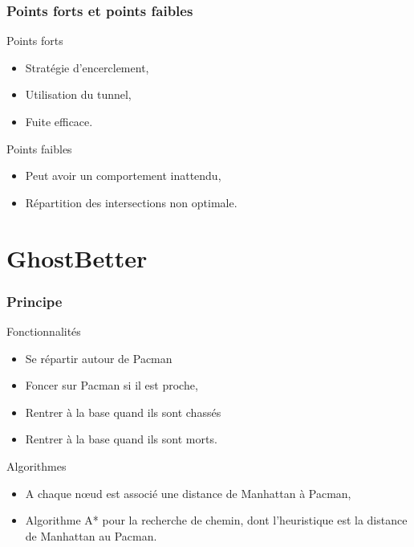 \documentclass[c]{beamer}
\begin{document}
\begin{frame}
    \frametitle{Points forts et points faibles}
    \begin{block}{Points forts}
        \begin{itemize}
            \item Stratégie d'encerclement,
            \item Utilisation du tunnel,
            \item Fuite efficace.
        \end{itemize}
    \end{block}
    \begin{block}{Points faibles}
        \begin{itemize}
            \item Peut avoir un comportement inattendu,
            \item Répartition des intersections non optimale.
        \end{itemize}
    \end{block}
\end{frame}

\section{GhostBetter}
\begin{frame}
    \frametitle{Principe}
    \begin{block}{Fonctionnalités}
        \begin{itemize}
            \item Se répartir autour de Pacman
            \item Foncer sur Pacman si il est proche,
            \item Rentrer à la base quand ils sont chassés
            \item Rentrer à la base quand ils sont morts.
        \end{itemize}
    \end{block}

	\begin{block}{Algorithmes}
	\begin{itemize}
        \item A chaque n\oe ud est associé une distance de Manhattan à Pacman,
        \item Algorithme A* pour la recherche de chemin, dont l'heuristique est la distance de Manhattan au Pacman.
	\end{itemize}
	\end{block}
\end{frame}
\end{document}
